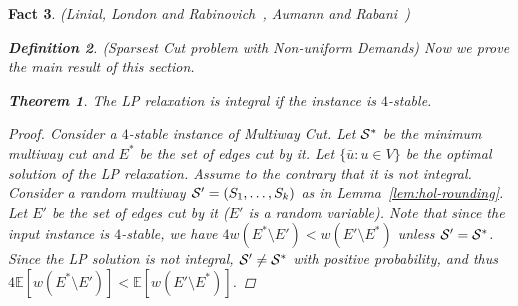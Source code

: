 \documentclass[twoside,leqno,twocolumn]{article}
\newcommand {\Exp}       {\mathbb{E}}
\newcommand {\E}     [1] {\Exp\left[#1\right]}
\newtheorem{theorem}{Theorem}[section]
\newtheorem{Definition}[theorem]{Definition}
\newtheorem{fact}[theorem]{Fact}
\begin{document}
\begin{fact}{\sc (Linial, London and Rabinovich~\cite{LLR}, Aumann and Rabani~\cite{AR})}
\begin{Definition} {\sc (Sparsest Cut problem with Non-uniform Demands)}
Now we prove the main result of this section.
\begin{theorem}\label{thm:main-multiway}
The LP relaxation is integral if the instance is $4$-stable.
\end{theorem}
\begin{proof}
Consider a $4$-stable instance of Multiway Cut. 
Let ${\cal S}^*$ be the minimum multiway cut and $E^*$ be the set of edges cut by it.
Let $\{\bar u:u\in V\}$ be the optimal solution of the LP relaxation. 
Assume to the contrary that it is not integral.
Consider a random multiway ${\cal S}'=(S_1,\dots, S_k)$ as in Lemma~\ref{lem:hol-rounding}.
Let $E'$ be the set of edges cut by it ($E'$ is a random variable).
Note that since the input instance is $4$-stable, we have
$4w(E^*\setminus E') < w(E' \setminus E^*)$
unless ${\cal S}' = {\cal S}^*$. 
Since the LP solution is not integral,
${\cal S}' \neq {\cal S}^*$ with positive probability, and
thus $4\E{w(E^*\setminus E')} < \E{w(E' \setminus E^*)}$.


\end{proof}
\end{Definition}
\end{fact}
\end{document}
